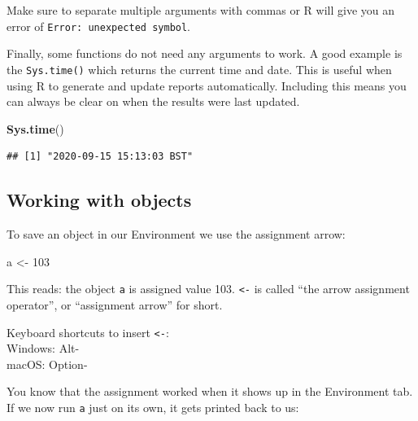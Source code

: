 \documentclass[
  12pt,
  krantz2]{krantz}
\makeatletter
\newenvironment{Shaded}{\begin{snugshade}}{\end{snugshade}}
\newcommand{\DecValTok}[1]{\textcolor[rgb]{0.00,0.00,0.81}{#1}}
\newcommand{\KeywordTok}[1]{\textcolor[rgb]{0.13,0.29,0.53}{\textbf{#1}}}
\newcommand{\NormalTok}[1]{#1}
\newcommand{\StringTok}[1]{\textcolor[rgb]{0.31,0.60,0.02}{#1}}
\renewenvironment{quote}{\begin{VF}}{\end{VF}}
\newenvironment{kframe}{%
\medskip{}
\setlength{\fboxsep}{.8em}
 \def\at@end@of@kframe{}%
 \ifinner\ifhmode%
  \def\at@end@of@kframe{\end{minipage}}%
  \begin{minipage}{\columnwidth}%
 \fi\fi%
 \def\FrameCommand##1{\hskip\@totalleftmargin \hskip-\fboxsep
 \colorbox{shadecolor}{##1}\hskip-\fboxsep
     \hskip-\linewidth \hskip-\@totalleftmargin \hskip\columnwidth}%
 \MakeFramed {\advance\hsize-\width
   \@totalleftmargin\z@ \linewidth\hsize
   \@setminipage}}%
 {\par\unskip\endMakeFramed%
 \at@end@of@kframe}
\renewenvironment{Shaded}{\begin{kframe}}{\end{kframe}}
\makeatother
\begin{document}
\begin{quote}
Make sure to separate multiple arguments with commas or R will give you an error of \texttt{Error:\ unexpected\ symbol}.
\end{quote}

Finally, some functions do not need any arguments to work.
A good example is the \texttt{Sys.time()} which returns the current time and date.
This is useful when using R to generate and update reports automatically.
Including this means you can always be clear on when the results were last updated.


\begin{Shaded}
\begin{Highlighting}[]
\KeywordTok{Sys.time}\NormalTok{()}
\end{Highlighting}
\end{Shaded}

\begin{verbatim}
## [1] "2020-09-15 15:13:03 BST"
\end{verbatim}

\hypertarget{working-with-objects}{%
\subsection{Working with objects}\label{working-with-objects}}

To save an object in our Environment we use the assignment arrow:

\begin{Shaded}
\begin{Highlighting}[]
\NormalTok{a <-}\StringTok{ }\DecValTok{103}
\end{Highlighting}
\end{Shaded}

This reads: the object \texttt{a} is assigned value 103.
\texttt{\textless{}-} is called ``the arrow assignment operator'', or ``assignment arrow'' for short.

\begin{quote}
Keyboard shortcuts to insert \texttt{\textless{}-}:\\
Windows: Alt-\\
macOS: Option-
\end{quote}

You know that the assignment worked when it shows up in the Environment tab.
If we now run \texttt{a} just on its own, it gets printed back to us:
\end{document}
